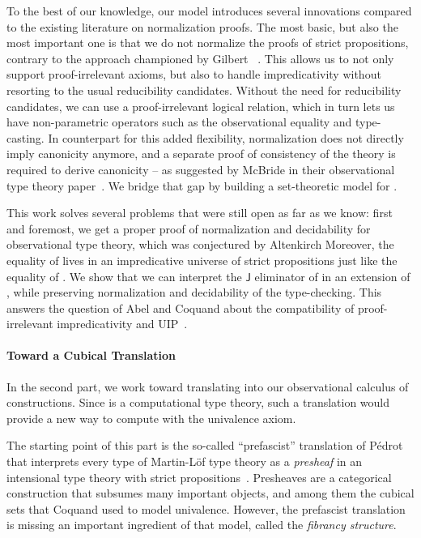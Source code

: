 To the best of our knowledge, our model introduces several innovations compared 
to the existing literature on normalization proofs.
% 
The most basic, but also the most important one is that we do not normalize the 
proofs of strict propositions, contrary to the approach championed by 
Gilbert \etal~. 
% 
This allows us to not only support proof-irrelevant axioms, but also to handle 
impredicativity without resorting to the usual reducibility candidates.
% 
Without the need for reducibility candidates, we can use a proof-irrelevant
logical relation, which in turn lets us have non-parametric operators such
as the observational equality and type-casting.
% 
In counterpart for this added flexibility, normalization does not directly
imply canonicity anymore, and a separate proof of consistency of the
theory is required to derive canonicity -- as suggested by McBride \etal in
their observational type theory paper~.
% 
We bridge that gap by building a set-theoretic model for \SetoidCC.

This work solves several problems that were still open as far as we know:
% 
% 
first and foremost, we get a proper proof of normalization and decidability for 
observational type theory, which was conjectured by Altenkirch \etal
% 
Moreover, the equality of \SetoidCC lives in an impredicative universe 
of strict propositions just like the equality of \Lean. 
% 
We show that we can interpret the \( \mathsf{J} \) eliminator of \Lean
in an extension of \SetoidCC, while preserving normalization and decidability
of the type-checking.
% 
This answers the question of Abel and Coquand about the compatibility of 
proof-irrelevant impredicativity and UIP~.

\paragraph{Toward a Cubical Translation}
% 
In the second part, we work toward translating \HoTT into our observational
calculus of constructions.
% 
Since \SetoidCC is a computational type theory, such a translation would 
provide a new way to compute with the univalence axiom.

The starting point of this part is the so-called ``prefascist'' translation of
Pédrot that interprets every type of Martin-Löf type theory as a 
\emph{presheaf} in an intensional type theory with strict 
propositions~.
% 
Presheaves are a categorical construction that subsumes many important
objects, and among them the cubical sets that Coquand \etal used to model
univalence.
% 
However, the prefascist translation is missing an important ingredient of
that model, called the \emph{fibrancy structure}.

